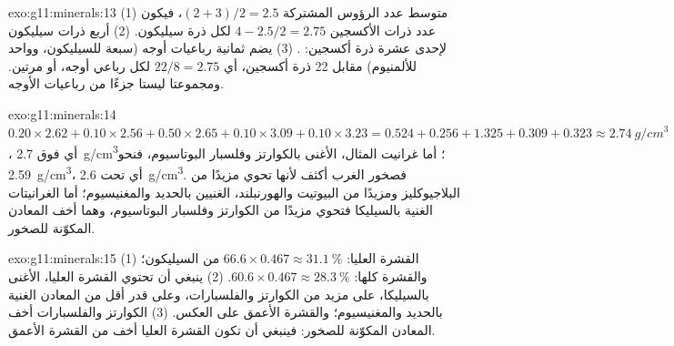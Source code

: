 \begin{solution}{exo:g11:minerals:13}
(1) متوسط عدد الرؤوس المشتركة $(2 + 3)/2 = 2.5$، فيكون عدد ذرات الأكسجين
$4 - 2.5/2 = 2.75$ لكل ذرة سيليكون. (2) أربع ذرات سيليكون لإحدى عشرة ذرة أكسجين:
. (3) يضم  ثمانية رباعيات أوجه (سبعة للسيليكون، وواحد
للألمنيوم) مقابل 22 ذرة أكسجين، أي $22/8 = 2.75$ لكل رباعي أوجه، أو
 مرتين. ومجموعتا  ليستا جزءًا من رباعيات الأوجه.
\end{solution}

\begin{solution}{exo:g11:minerals:14}
$0.20 \times 2.62 + 0.10 \times 2.56 + 0.50 \times 2.65 + 0.10 \times 3.09 +
0.10 \times 3.23 = 0.524 + 0.256 + 1.325 + 0.309 + 0.323 \approx
\qty{2.74}{g/cm^3}$، أي فوق \qty{2.7}{g/cm^3}؛ أما غرانيت المثال،
الأغنى بالكوارتز وفلسبار البوتاسيوم، فنحو \qty{2.59}{g/cm^3}، أي تحت
\qty{2.6}{g/cm^3}. فصخور الغرب أكثف لأنها تحوي مزيدًا من
البلاجيوكليز ومزيدًا من البيوتيت والهورنبلند، الغنيين بالحديد والمغنيسيوم؛ أما
الغرانيتات الغنية بالسيليكا فتحوي مزيدًا من الكوارتز وفلسبار البوتاسيوم، وهما أخف
المعادن المكوّنة للصخور.
\end{solution}

\begin{solution}{exo:g11:minerals:15}
(1) القشرة العليا: $66.6 \times 0.467 \approx \qty{31.1}{\percent}$ من السيليكون؛
والقشرة كلها: $60.6 \times 0.467 \approx \qty{28.3}{\percent}$. (2) ينبغي أن تحتوي القشرة
العليا، الأغنى بالسيليكا، على مزيد من الكوارتز والفلسبارات، وعلى قدر أقل من
المعادن الغنية بالحديد والمغنيسيوم؛ والقشرة الأعمق على العكس. (3) الكوارتز
والفلسبارات أخف المعادن المكوّنة للصخور: فينبغي أن تكون القشرة العليا
أخف من القشرة الأعمق.
\end{solution}

